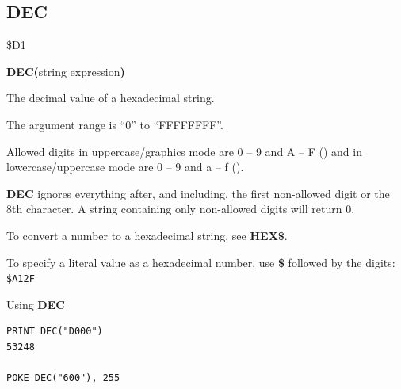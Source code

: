 \subsection{DEC}
\begin{description}[leftmargin=2cm,style=nextline]
\item [Token:]    \$D1

\item [Format:]   {\bf DEC(}string expression{\bf)}

\item [Returns:]  The decimal value of a hexadecimal string.

                  The argument range is ``0'' to ``FFFFFFFF''.

\item [Remarks:]  Allowed digits in uppercase/graphics mode are 0 -- 9 and A -- F () and in lowercase/uppercase mode are 0 -- 9 and a -- f ().

                  {\bf DEC} ignores everything after, and including, the first non-allowed digit or the 8th character. A string containing only non-allowed digits will return 0.

                  To convert a number to a hexadecimal string, see {\bf HEX\$}.

                  To specify a literal value as a hexadecimal number, use {\bf \$} followed by the digits: \texttt{\$A12F}

\item [Examples:] Using {\bf DEC}

\begin{tcolorbox}[colback=black,coltext=white]
\verbatimfont{\codefont}
\begin{verbatim}
PRINT DEC("D000")
53248

POKE DEC("600"), 255
\end{verbatim}
\end{tcolorbox}
\end{description}


\newpage

